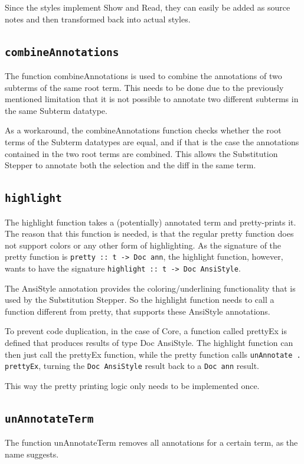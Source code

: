 Since the styles implement Show and Read,
they can easily be added as source notes and then transformed back into actual styles.

\subsection{\texttt{combineAnnotations}}
The function combineAnnotations is used to combine the annotations of two subterms of the same root term.
This needs to be done due to the previously mentioned limitation that it is not possible to annotate two different subterms in the same Subterm datatype.

As a workaround,
the combineAnnotations function checks whether the root terms of the Subterm datatypes are equal,
and if that is the case the annotations contained in the two root terms are combined.
This allows the Substitution Stepper to annotate both the selection and the diff in the same term.

\subsection{\texttt{highlight}}
The highlight function takes a (potentially) annotated term and pretty-prints it.
The reason that this function is needed,
is that the regular pretty function does not support colors or any other form of highlighting.
As the signature of the pretty function is \texttt{pretty :: t -> Doc ann},
the highlight function, however, wants to have the signature \texttt{highlight :: t -> Doc AnsiStyle}.

The AnsiStyle annotation provides the coloring/underlining functionality that is used by the Substitution Stepper.
So the highlight function needs to call a function different from pretty,
that supports these AnsiStyle annotations.

To prevent code duplication,
in the case of Core,
a function called prettyEx is defined that produces results of type Doc AnsiStyle.
The highlight function can then just call the prettyEx function,
while the pretty function calls \texttt{unAnnotate . prettyEx},
turning the \texttt{Doc AnsiStyle} result back to a \texttt{Doc ann} result.

This way the pretty printing logic only needs to be implemented once.

\subsection{\texttt{unAnnotateTerm}}
The function unAnnotateTerm removes all annotations for a certain term,
as the name suggests.

